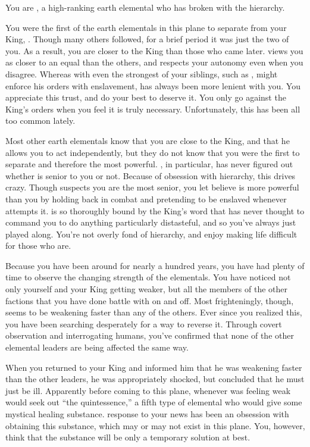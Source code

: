 \documentclass[char]{elementals}
\begin{document}
\name{\cRogue{}}

You are \cRogue{\intro}, a high-ranking earth elemental who has broken with the hierarchy.

You were the first of the earth elementals in this plane to separate from your King, \cEarthKing{}.  Though many others followed, for a brief period it was just the two of you.  As a result, you are closer to the King than those who came later.  \cEarthKing{\They} views you as closer to an equal than the others, and respects your autonomy even when you disagree.  Whereas with even the strongest of your siblings, such as \cLoyal{\intro}, \cEarthKing{} might enforce his orders with enslavement, \cEarthKing{\they} has always been more lenient with you.  You appreciate this trust, and do your best to deserve it.  You only go against the King's orders when you feel it is truly necessary.  Unfortunately, this has been all too common lately.

Most other earth elementals know that you are close to the King, and that he allows you to act independently, but they do not know that you were the first to separate and therefore the most powerful.  \cLoyal{}, in particular, has never figured out whether \cLoyal{\they} is senior to you or not.  Because of \cLoyal{\their} obsession with hierarchy, this drives \cLoyal{\them} crazy.  Though \cLoyal{\they} suspects you are the most senior, you let \cLoyal{\them} believe \cLoyal{\they} is more powerful than you by holding back in combat and pretending to be enslaved whenever \cLoyal{\they} attempts it.  \cLoyal{} is so thoroughly bound by the King's word that \cLoyal{\they} has never thought to command you to do anything particularly distasteful, and so you've always just played along.  You're not overly fond of hierarchy, and enjoy making life difficult for those who are.

Because you have been around for nearly a hundred years, you have had plenty of time to observe the changing strength of the elementals.  You have noticed not only yourself and your King getting weaker, but all the members of the other factions that you have done battle with on and off.  Most frighteningly, though, \cEarthKing{} seems to be weakening faster than any of the others.  Ever since you realized this, you have been searching desperately for a way to reverse it.  Through covert observation and interrogating humans, you've confirmed that none of the other elemental leaders are being affected the same way.

When you returned to your King and informed him that he was weakening faster than the other leaders, he was appropriately shocked, but concluded that he must just be ill.  Apparently before coming to this plane, whenever \cEarthKing{\they} was feeling weak \cEarthKing{\they} would seek out ``the quintessence,'' a fifth type of elemental who would give \cEarthKing{\them} some mystical healing substance.  \cEarthKing{\Their} response to your news has been an obsession with obtaining this substance, which may or may not exist in this plane.  You, however, think that the substance will be only a temporary solution at best.
\end{document}
